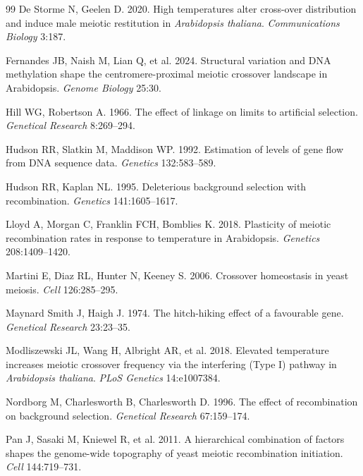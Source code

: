 \documentclass[11pt]{article}
\theoremstyle{remark}
\begin{document}
\begin{thebibliography}{99}
De Storme N, Geelen D. 2020. High temperatures alter cross-over distribution and
induce male meiotic restitution in \emph{Arabidopsis thaliana}.
\emph{Communications Biology} 3:187.

Fernandes JB, Naish M, Lian Q, et al. 2024. Structural variation and DNA
methylation shape the centromere-proximal meiotic crossover landscape in
Arabidopsis. \emph{Genome Biology} 25:30.

Hill WG, Robertson A. 1966. The effect of linkage on limits to artificial
selection. \emph{Genetical Research} 8:269--294.

Hudson RR, Slatkin M, Maddison WP. 1992. Estimation of levels of gene flow from DNA
sequence data. \emph{Genetics} 132:583--589.

Hudson RR, Kaplan NL. 1995. Deleterious background selection with recombination.
\emph{Genetics} 141:1605--1617.

Lloyd A, Morgan C, Franklin FCH, Bomblies K. 2018. Plasticity of meiotic
recombination rates in response to temperature in Arabidopsis.
\emph{Genetics} 208:1409--1420.

Martini E, Diaz RL, Hunter N, Keeney S. 2006. Crossover homeostasis in yeast
meiosis. \emph{Cell} 126:285--295.

Maynard Smith J, Haigh J. 1974. The hitch-hiking effect of a favourable gene.
\emph{Genetical Research} 23:23--35.

Modliszewski JL, Wang H, Albright AR, et al. 2018. Elevated temperature increases
meiotic crossover frequency via the interfering (Type I) pathway in
\emph{Arabidopsis thaliana}. \emph{PLoS Genetics} 14:e1007384.

Nordborg M, Charlesworth B, Charlesworth D. 1996. The effect of recombination on
background selection. \emph{Genetical Research} 67:159--174.

Pan J, Sasaki M, Kniewel R, et al. 2011. A hierarchical combination of factors
shapes the genome-wide topography of yeast meiotic recombination initiation.
\emph{Cell} 144:719--731.


\end{thebibliography}
\end{document}
